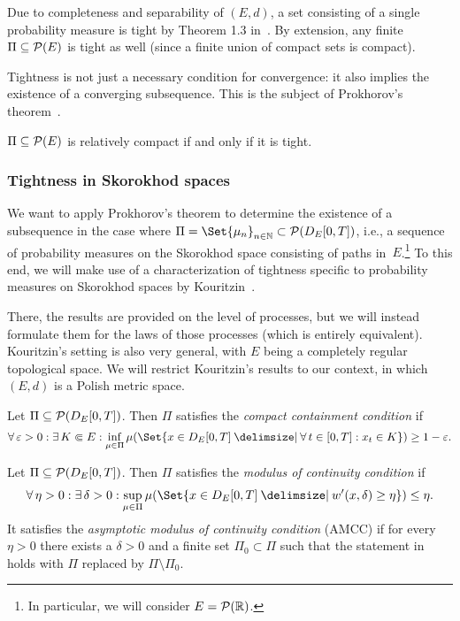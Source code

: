 Due to completeness and separability of \((E,d)\), a set consisting of a single probability measure is tight by Theorem 1.3 in~\cite{billingsleyConvergenceProbabilityMeasures1999}.
By extension, any finite \(\Pi \subseteq \mathcal{P}(E)\) is tight as well (since a finite union of compact sets is compact).

Tightness is not just a necessary condition for convergence: it also implies the existence of a converging subsequence.
This is the subject of Prokhorov's theorem~\cite[57-65]{billingsleyConvergenceProbabilityMeasures1999}.

\begin{theorem}[Prokhorov]
  \( \Pi \subseteq \mathcal{P}(E) \) is relatively compact if and only if it is tight.
\end{theorem}

\subsubsection{Tightness in Skorokhod spaces}

We want to apply Prokhorov's theorem to determine the existence of a subsequence in the case where \( \Pi = \Set{\mu_n}_{n\in\bN} \subset \cP(D_{E}[0,T]) \), i.e., a sequence of probability measures on the Skorokhod space consisting of paths in~\(E\).\footnote{In particular, we will consider \(E = \mathcal{P}(\mathbb{R})\).}
To this end, we will make use of a characterization of tightness specific to probability measures on Skorokhod spaces by Kouritzin~\cite{kouritzinTightnessProbabilityMeasures2015}.

There, the results are provided on the level of processes, but we will instead formulate them for the laws of those processes (which is entirely equivalent).
Kouritzin's setting is also very general, with \( E \) being a completely regular topological space.
We will restrict Kouritzin's results to our context, in which \((E,d)\) is a Polish metric space.

\begin{definition}[CCC]
  Let \( \Pi \subseteq \mathcal{P}(D_{E}[0,T]) \).
  Then \( \Pi \) satisfies the \textit{compact containment condition} if
  \begin{equation}
    \forall \eps > 0 : \exists K \Subset E : \inf_{\mu \in \Pi} \mu(\Set{x \in D_E[0,T] \given \forall t \in [0,T] : x_t \in K}) \geq 1 - \eps.
  \end{equation}
\end{definition}

\begin{definition}[MCC]
  Let \( \Pi \subseteq \mathcal{P}(D_{E}[0,T]) \).
  Then \( \Pi \) satisfies the \textit{modulus of continuity condition} if
  \begin{equation}\label{eq:MCC}
    \forall \eta > 0 : \exists \delta > 0 : \sup_{\mu \in \Pi} \mu(\Set{x \in D_E[0,T] \given w'(x,\delta) \geq \eta}) \leq \eta.
  \end{equation}
  It satisfies the \textit{asymptotic modulus of continuity condition} (AMCC) if for every \( \eta > 0 \) there exists a \( \delta > 0 \) and a finite set \( \Pi_0 \subset \Pi \) such that the statement in  holds with \( \Pi \) replaced by \( \Pi \setminus \Pi_0 \).
\end{definition}

